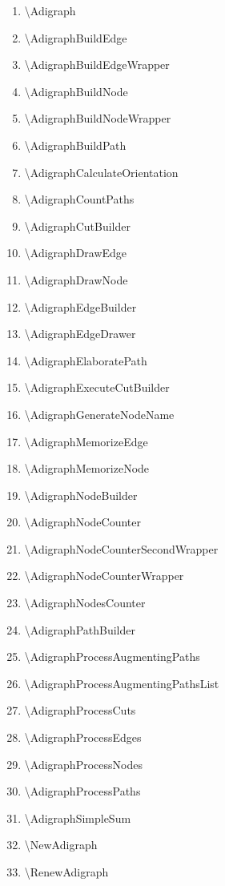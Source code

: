 \documentclass{report}
\begin{document}
\begin{multicols}{2}
	\begin{enumerate}
		\item \textbackslash Adigraph
		\item \textbackslash AdigraphBuildEdge
		\item \textbackslash AdigraphBuildEdgeWrapper
		\item \textbackslash AdigraphBuildNode
		\item \textbackslash AdigraphBuildNodeWrapper
		\item \textbackslash AdigraphBuildPath
		\item \textbackslash AdigraphCalculateOrientation
		\item \textbackslash AdigraphCountPaths
		\item \textbackslash AdigraphCutBuilder
		\item \textbackslash AdigraphDrawEdge
		\item \textbackslash AdigraphDrawNode
		\item \textbackslash AdigraphEdgeBuilder
		\item \textbackslash AdigraphEdgeDrawer
		\item \textbackslash AdigraphElaboratePath
		\item \textbackslash AdigraphExecuteCutBuilder
		\item \textbackslash AdigraphGenerateNodeName
		\item \textbackslash AdigraphMemorizeEdge
		\item \textbackslash AdigraphMemorizeNode
		\item \textbackslash AdigraphNodeBuilder
		\item \textbackslash AdigraphNodeCounter
		\item \textbackslash AdigraphNodeCounterSecondWrapper
		\item \textbackslash AdigraphNodeCounterWrapper
		\item \textbackslash AdigraphNodesCounter
		\item \textbackslash AdigraphPathBuilder
		\item \textbackslash AdigraphProcessAugmentingPaths
		\item \textbackslash AdigraphProcessAugmentingPathsList
		\item \textbackslash AdigraphProcessCuts
		\item \textbackslash AdigraphProcessEdges
		\item \textbackslash AdigraphProcessNodes
		\item \textbackslash AdigraphProcessPaths
		\item \textbackslash AdigraphSimpleSum
		\item \textbackslash NewAdigraph
		\item \textbackslash RenewAdigraph
	\end{enumerate}
\end{multicols}
\end{document}
